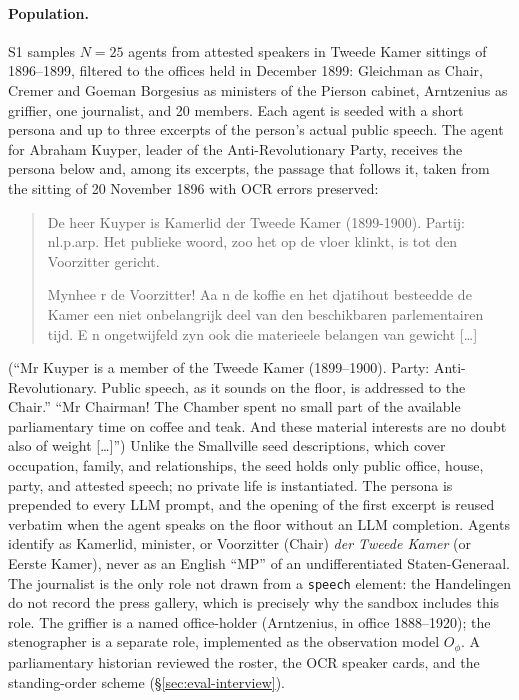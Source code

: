 \documentclass[sigconf,review,anonymous]{acmart}
\begin{document}
\paragraph{Population.} S1 samples $N{=}25$ agents from attested speakers
in Tweede Kamer sittings of 1896--1899, filtered to the offices held in
December 1899: Gleichman as Chair, Cremer and Goeman Borgesius as
ministers of the Pierson cabinet, Arntzenius as griffier, one journalist,
and 20 members. Each agent is seeded with a short persona and up to three
excerpts of the person's actual public speech. The agent for Abraham
Kuyper, leader of the Anti-Revolutionary Party, receives the persona below
and, among its excerpts, the passage that follows it, taken from the
sitting of 20 November 1896 with OCR errors preserved:
\begin{quote}\small\ttfamily\raggedright
De heer Kuyper is Kamerlid der Tweede Kamer (1899-1900). Partij: nl.p.arp.
Het publieke woord, zoo het op de vloer klinkt, is tot den Voorzitter
gericht.\par\smallskip
Mynhee r de Voorzitter! Aa n de koffie en het djatihout besteedde de Kamer
een niet onbelangrijk deel van den beschikbaren parlementairen tijd. E n
ongetwijfeld zyn ook die materieele belangen van gewicht [\ldots]
\end{quote}
(``Mr Kuyper is a member of the Tweede Kamer (1899--1900). Party:
Anti-Revolutionary. Public speech, as it sounds on the floor, is addressed
to the Chair.'' ``Mr Chairman! The Chamber spent no small part of the
available parliamentary time on coffee and teak. And these material
interests are no doubt also of weight [\ldots]'') Unlike the Smallville
seed descriptions, which cover occupation, family, and relationships, the
seed holds only public office, house, party, and attested speech; no
private life is instantiated. The persona is prepended to every LLM
prompt, and the opening of the first excerpt is reused verbatim when the
agent speaks on the floor without an LLM completion. Agents identify as
Kamerlid, minister, or Voorzitter (Chair) \emph{der Tweede Kamer} (or
Eerste Kamer), never as an English ``MP'' of an undifferentiated
Staten-Generaal. The journalist is the only role not drawn from a
\texttt{speech} element: the Handelingen do not record the press gallery,
which is precisely why the sandbox includes this role. The griffier is a
named office-holder (Arntzenius, in office 1888--1920); the stenographer is
a separate role, implemented as the observation model $O_\phi$. A
parliamentary historian reviewed
the roster, the OCR speaker cards, and the standing-order scheme
(\S\ref{sec:eval-interview}).
\end{document}
